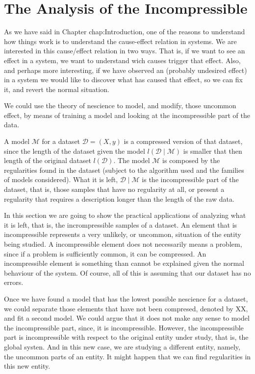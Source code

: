 %
%

\section{The Analysis of the Incompressible}

As we have said in Chapter {chap:Introduction}, one of the reasons to understand how things work is to understand the cause-effect relation in systems. We are interested in this cause/effect relation in two ways. That is, if we want to see an effect in a system, we want to understand wich causes trigger that effect. Also, and perhaps more interesting, if we have observed an (probably undesired effect) in a system we would like to discover what has caused that effect, so we can fix it, and revert the normal situation.

We could use the theory of nescience to model, and modify, those uncommon effect, by means of training a model and looking at the incompressible part of the data.


A model $\mathcal{M}$ for a dataset $\mathcal{D} = (X, y)$ is a compressed version of that dataset, since the length of the dataset given the model $l(\mathcal{D} \mid \mathcal{M})$ is smaller that then length of the original dataset $l(\mathcal{D})$. The model $\mathcal{M}$ is composed by the regularities found in the dataset (subject to the algorithm used and the families of models considered). What it is left, $\mathcal{D} \mid \mathcal{M}$ is the incompressible part of the dataset, that is, those samples that have no regularity at all, or present a regularity that requires a description longer than the length of the raw data.

In this section we are going to show the practical applications of analyzing what it is left, that is, the incrompressible samples of a dataset. An element that is incompressible represents a very unlikely, or uncommon, situation of the entity being studied. A incompressible element does not necessarily means a problem, since if a problem is sufficiently common, it can be compressed. An incompressible element is something than cannot be explained given the normal behaviour of the system. Of course, all of this is assuming that our dataset has no errors.

Once we have found a model that has the lowest possible nescience for a dataset, we could separate those elements that have not been compresed, denoted by XX, and fit a second model. We could argue that it does not make any sense to model the incompressible part, since, it is incompressible. However, the incompressible part is incompressible with respect to the original entity under study, that is, the global systen. And in this new case, we are studying a different entity, namely, the uncommon parts of an entity. It might happen that we can find regularities in this new entity.



